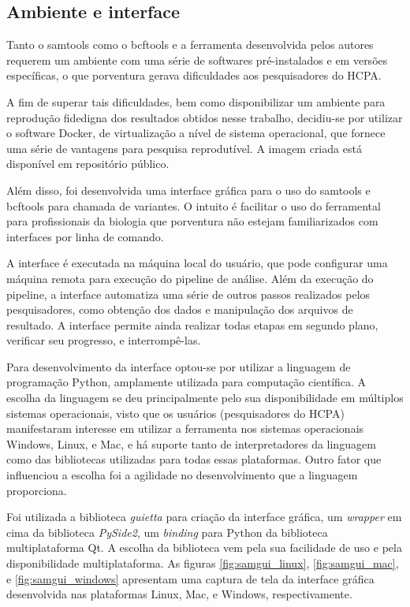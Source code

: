 \documentclass[cic,tc]{iiufrgs}
\begin{document}
\subsection{Ambiente e interface}

Tanto o samtools como o bcftools e a ferramenta desenvolvida pelos autores
requerem um ambiente com uma série de softwares pré-instalados e em versões
específicas, o que porventura gerava dificuldades aos pesquisadores do HCPA.

A fim de superar tais dificuldades, bem como disponibilizar um ambiente para
reprodução fidedigna dos resultados obtidos nesse trabalho, decidiu-se por
utilizar o software Docker, de virtualização a nível de sistema operacional,
que fornece uma série de vantagens para pesquisa
reprodutível.\cite{boettiger2015introduction} A imagem criada está disponível
em repositório público.\cite{dockerme}

Além disso, foi desenvolvida uma interface gráfica para o uso do samtools e
bcftools para chamada de variantes. O intuito é facilitar o uso do ferramental
para profissionais da biologia que porventura não estejam familiarizados com
interfaces por linha de comando.

A interface é executada na máquina local do usuário, que pode configurar uma
máquina remota para execução do pipeline de análise. Além da execução do
pipeline, a interface automatiza uma série de outros passos realizados pelos
pesquisadores, como obtenção dos dados e manipulação dos arquivos de resultado.
A interface permite ainda realizar todas etapas em segundo plano, verificar seu
progresso, e interrompê-las.

Para desenvolvimento da interface optou-se por utilizar a linguagem de
programação Python, amplamente utilizada para computação
científica.\cite{oliphant2007python} A escolha da linguagem se deu
principalmente pelo sua disponibilidade em múltiplos sistemas operacionais,
visto que os usuários (pesquisadores do HCPA) manifestaram interesse em
utilizar a ferramenta nos sistemas operacionais Windows, Linux, e Mac, e há
suporte tanto de interpretadores da linguagem como das bibliotecas utilizadas
para todas essas plataformas.\cite{oliphant2007python} Outro fator que
influenciou a escolha foi a agilidade no desenvolvimento que a linguagem
proporciona.\cite{oliphant2007python}

Foi utilizada a biblioteca \textit{guietta} para criação da interface
gráfica,\cite{guietta} um \textit{wrapper} em cima da biblioteca
\textit{PySide2}, um \textit{binding} para Python da biblioteca multiplataforma
Qt.\cite{loganathan2013pyside} A escolha da biblioteca vem pela sua facilidade
de uso e pela disponibilidade multiplataforma. As figuras
\ref{fig:samgui_linux}, \ref{fig:samgui_mac}, e \ref{fig:samgui_windows}
apresentam uma captura de tela da interface gráfica desenvolvida nas
plataformas Linux, Mac, e Windows, respectivamente.
\end{document}
